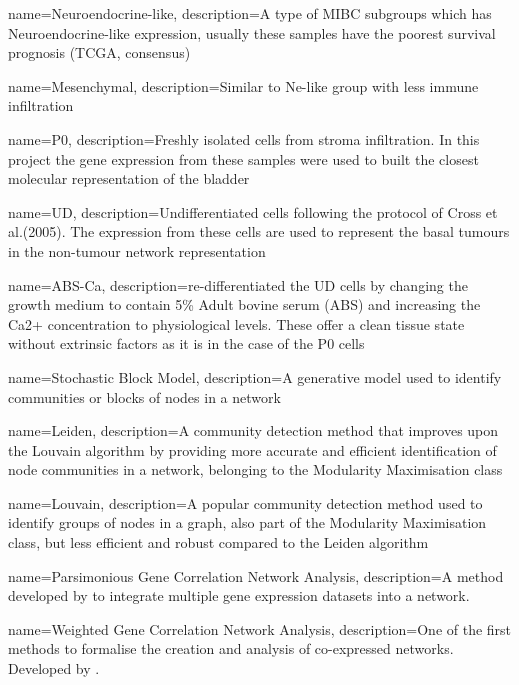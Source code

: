 {
    name=Neuroendocrine-like,
    description={A type of MIBC subgroups which has Neuroendocrine-like expression, usually these samples have the poorest survival prognosis (TCGA, consensus)}
}

{
    name=Mesenchymal,
    description={Similar to Ne-like group with less immune infiltration}
}

{
    name=P0,
    description={Freshly isolated cells from stroma infiltration. In this project the gene expression from these samples were used to built the closest molecular representation of the bladder}
}

{
    name=UD,
    description={Undifferentiated cells following the protocol of Cross et al.(2005). The expression from these cells are used to represent the basal tumours in the non-tumour network representation}
}

{
    name=ABS-Ca,
    description={re-differentiated the UD cells by changing the growth medium to contain 5\% Adult bovine serum (ABS) and increasing the Ca2+ concentration to physiological levels. These offer a clean tissue state without extrinsic factors as it is in the case of the P0 cells}
}


{
    name=Stochastic Block Model,
    description={A generative model used to identify communities or blocks of nodes in a network}
}

{
    name=Leiden,
    description={A community detection method that improves upon the Louvain algorithm by providing more accurate and efficient identification of node communities in a network, belonging to the Modularity Maximisation class}
}

{
    name=Louvain,
    description={A popular community detection method used to identify groups of nodes in a graph, also part of the Modularity Maximisation class, but less efficient and robust compared to the Leiden algorithm}
}


{
    name=Parsimonious Gene Correlation Network Analysis,
    description={A method developed by \citet{Care2019-ij} to integrate multiple gene expression datasets into a network.}
}

{
    name=Weighted Gene Correlation Network Analysis,
    description={One of the first methods to formalise the creation and analysis of co-expressed networks. Developed by \citet{Langfelder2008-sn}.}
}


